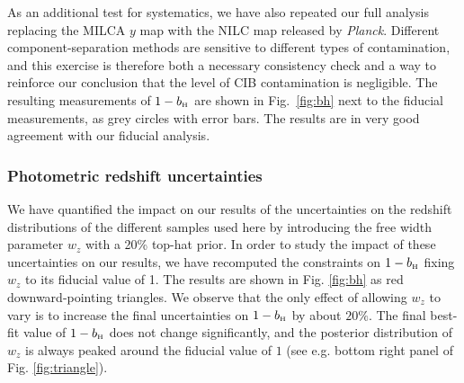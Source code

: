 \documentclass[useAMS,usenatbib]{mn2e}
\def\bH{b_{\scriptscriptstyle\rm H}}
\def\planck{{\it Planck\/}}
\begin{document}
      As an additional test for systematics, we have also repeated our full analysis replacing the MILCA $y$ map with the NILC map released by \planck. Different component-separation methods are sensitive to different types of contamination, and this exercise is therefore both a necessary consistency check and a way to reinforce our conclusion that the level of CIB contamination is negligible. The resulting measurements of $1-\bH$ are shown in Fig.\!~\ref{fig:bh} next to the fiducial measurements, as grey circles with error bars. The results are in very good agreement with our fiducial analysis.
      
    \subsubsection{Photometric redshift uncertainties}\label{sssec:results.syst.pz}
      We have quantified the impact on our results of the uncertainties on the redshift distributions of the different samples used here by introducing the free width parameter $w_z$ with a 20\% top-hat prior. In order to study the impact of these uncertainties on our results, we have recomputed the constraints on $1-\bH$ fixing $w_z$ to its fiducial value of 1. The results are shown in Fig. \ref{fig:bh} as red downward-pointing triangles. We observe that the only effect of allowing $w_z$ to vary is to increase the final uncertainties on $1-\bH$ by about $20\%$. The final best-fit value of $1-\bH$ does not change significantly, and the posterior distribution of $w_z$ is always peaked around the fiducial value of $1$ (see e.g. bottom right panel of Fig. \ref{fig:triangle}).
      
\end{document}
